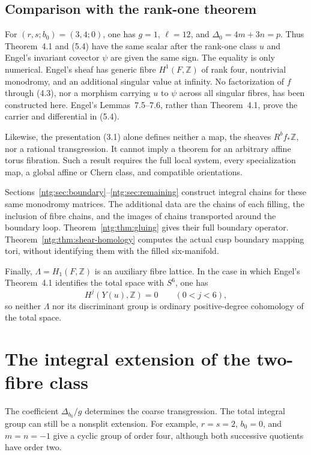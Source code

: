 \documentclass[11pt]{article}
\numberwithin{equation}{section}
\begin{document}
\subsection*{Comparison with the rank-one theorem}

For $(r,s;b_0)=(3,4;0)$, one has $g=1$, $\ell=12$, and
$\Delta_0=4m+3n=p$.  Thus Theorem~4.1 and (5.4) have the same scalar after
the rank-one class $u$ and Engel's invariant covector $\psi$ are given the
same sign.  The equality is only numerical.  Engel's sheaf has generic fibre
$H^1(F,\mathbb Z)$ of rank four, nontrivial monodromy, and an additional
singular value at infinity.  No factorization of $f$ through (4.3), nor a
morphism carrying $u$ to $\psi$ across all singular fibres, has been
constructed here.  Engel's Lemmas~7.5--7.6, rather than Theorem~4.1, prove
the carrier and differential in (5.4).

Likewise, the presentation (3.1) alone defines neither a map, the sheaves
$R^bf_*\mathbb Z$, nor a rational transgression.  It cannot imply a theorem
for an arbitrary affine torus fibration.  Such a result requires the full
local system, every specialization map, a global affine or Chern class, and
compatible orientations.

Sections~\ref{ntg:sec:boundary}--\ref{ntg:sec:remaining} construct
integral chains for these same monodromy matrices. The additional data
are the chains of each filling, the inclusion of fibre chains, and the
images of chains transported around the boundary loop.
Theorem~\ref{ntg:thm:gluing} gives their full boundary operator.
Theorem~\ref{ntg:thm:shear-homology} computes the actual cusp boundary
mapping tori, without identifying them with the filled six-manifold.

Finally, $\Lambda=H_1(F,\mathbb Z)$ is an auxiliary fibre lattice.  In the
case in which Engel's Theorem~4.1 identifies the total space with $S^6$, one
has
\[
 H^j(Y(u),\mathbb Z)=0\qquad(0<j<6),
\]
so neither $\Lambda$ nor its discriminant group is ordinary positive-degree
cohomology of the total space.

\section{The integral extension of the two-fibre class}

The coefficient $\Delta_{b_0}/g$ determines the coarse transgression.
The total integral group can still be a nonsplit extension.  For example,
$r=s=2$, $b_0=0$, and $m=n=-1$ give a cyclic group of order four,
although both successive quotients have order two.
\end{document}
